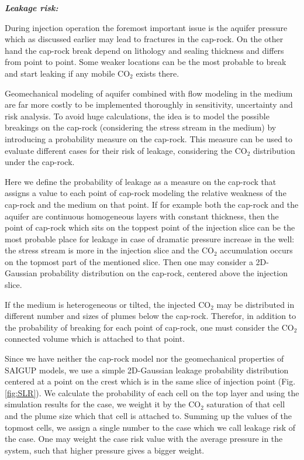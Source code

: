 \textbf{\textit{Leakage risk:}}

During injection operation the foremost important issue is the aquifer pressure which as discussed earlier may lead to fractures in the cap-rock. On the other hand the cap-rock break depend on lithology and sealing thickness and differs from point to point. Some weaker locations can be the most probable to
break and start leaking if any mobile CO$_2$ exists there.

Geomechanical modeling of aquifer combined with flow modeling in the medium are far more costly to be implemented thoroughly in sensitivity, uncertainty and risk analysis. To avoid huge calculations, the idea is to model the possible breakings on the cap-rock (considering the stress stream in the medium) by introducing a probability measure on the cap-rock. This measure can be used to evaluate different cases for their risk of leakage, considering the CO$_2$ distribution under the cap-rock. 

Here we define the probability of leakage as a measure on the cap-rock that assigns a value to each point of cap-rock modeling the relative weakness of the cap-rock and the medium on that point. If for example both the cap-rock and the aquifer are continuous homogeneous layers with constant thickness, then the point of cap-rock which sits on the toppest point of the injection slice can be the most probable place for leakage in case of dramatic pressure increase in the well: the stress stream is more in the injection slice and the CO$_2$ accumulation occurs on the topmost part of the mentioned slice. Then one may consider a 2D-Gaussian probability distribution on the cap-rock, centered above the injection slice.

If the medium is heterogeneous or tilted, the injected CO$_2$ may be distributed in different number and sizes of plumes below the cap-rock. Therefor, in addition to the probability of breaking for each point of cap-rock, one must consider the CO$_2$ connected volume which is attached to that point. 

Since we have neither the cap-rock model nor the geomechanical properties of SAIGUP models, we use a simple 2D-Gaussian leakage probability distribution centered at a point on the crest which is in the same slice of injection point (Fig. \ref{fig:SLR}). We calculate the probability of each cell on the top layer and using the simulation results for the case, we weight it by the CO$_2$ saturation of that cell and the plume size which that cell is attached to. Summing up the values of the topmost cells, we assign a single number to the case which we call leakage risk of the case. One may weight the case risk value with the average pressure in the system, such that higher pressure gives a bigger weight.

